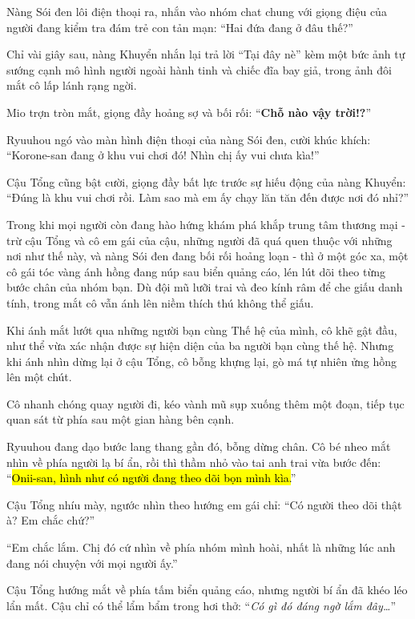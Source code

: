 \documentclass[../main.tex]{subfiles}
\begin{document}
Nàng Sói đen lôi điện thoại ra, nhắn vào nhóm chat chung với giọng điệu của người đang kiểm tra đám trẻ con tản mạn: ``Hai đứa đang ở đâu thế?''

Chỉ vài giây sau, nàng Khuyển nhắn lại trả lời ``Tại đây nè'' kèm một bức ảnh tự sướng cạnh mô hình người ngoài hành tinh và chiếc đĩa bay giả, trong ảnh đôi mắt cô lấp lánh rạng ngời.


Mio trợn tròn mắt, giọng đầy hoảng sợ và bối rối: ``\textbf{Chỗ nào vậy trời!?}''

Ryuuhou ngó vào màn hình điện thoại của nàng Sói đen, cười khúc khích: ``Korone-san đang ở khu vui chơi đó! Nhìn chị ấy vui chưa kìa!''

Cậu Tổng cũng bật cười, giọng đầy bất lực trước sự hiếu động của nàng Khuyển: ``Đúng là khu vui chơi rồi. Làm sao mà em ấy chạy lăn tăn đến được nơi đó nhỉ?''

\il

Trong khi mọi người còn đang hào hứng khám phá khắp trung tâm thương mại - trừ cậu Tổng và cô em gái của cậu, những người đã quá quen thuộc với những nơi như thế này, và nàng Sói đen đang bối rối hoảng loạn - thì ở một góc xa, một cô gái tóc vàng ánh hồng đang núp sau biển quảng cáo, lén lút dõi theo từng bước chân của nhóm bạn. Dù đội mũ lưỡi trai và đeo kính râm để che giấu danh tính, trong mắt cô vẫn ánh lên niềm thích thú không thể giấu.

Khi ánh mắt lướt qua những người bạn cùng Thế hệ của mình, cô khẽ gật đầu, như thể vừa xác nhận được sự hiện diện của ba người bạn cùng thế hệ. Nhưng khi ánh nhìn dừng lại ở cậu Tổng, cô bỗng khựng lại, gò má tự nhiên ửng hồng lên một chút.

Cô nhanh chóng quay người đi, kéo vành mũ sụp xuống thêm một đoạn, tiếp tục quan sát từ phía sau một gian hàng bên cạnh.

Ryuuhou đang dạo bước lang thang gần đó, bỗng dừng chân. Cô bé nheo mắt nhìn về phía người lạ bí ẩn, rồi thì thầm nhỏ vào tai anh trai vừa bước đến: ``\hl{Onii-san, hình như có người đang theo dõi bọn mình kìa.}''

Cậu Tổng nhíu mày, ngước nhìn theo hướng em gái chỉ: ``Có người theo dõi thật à? Em chắc chứ?''

``Em chắc lắm. Chị đó cứ nhìn về phía nhóm mình hoài, nhất là những lúc anh đang nói chuyện với mọi người ấy.''

Cậu Tổng hướng mắt về phía tấm biển quảng cáo, nhưng người bí ẩn đã khéo léo lẩn mất. Cậu chỉ có thể lẩm bẩm trong hơi thở: ``\textit{Có gì đó đáng ngờ lắm đây\dots}''
\end{document}
